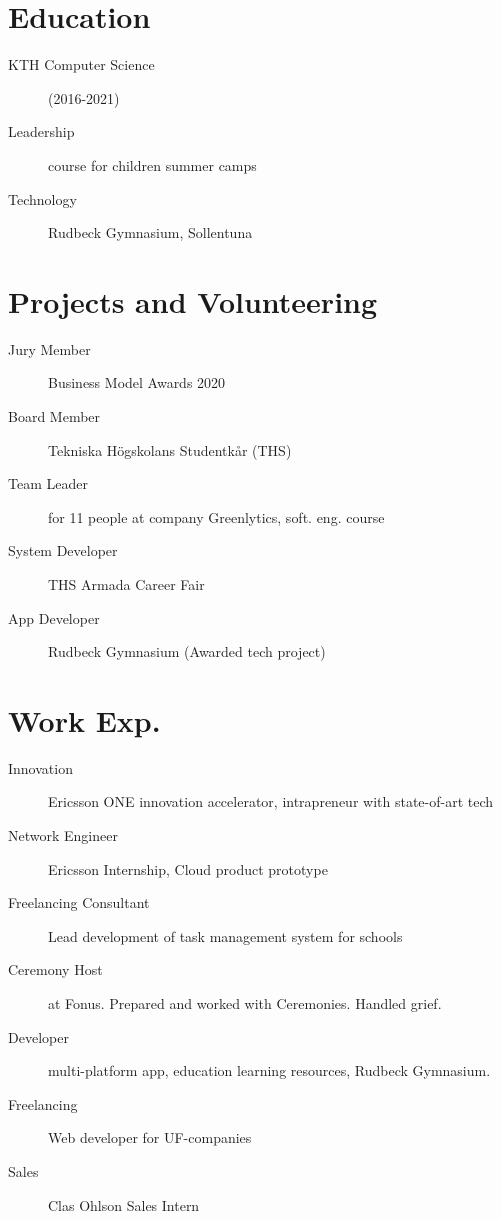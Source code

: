 \documentclass[margin,line,a4paper]{resume}
\begin{document}
\begin{resume}
\section{\mysidestyle Education}\vspace{1mm}
    \begin{description}
        \item[KTH Computer Science] (2016-2021)
         \item[Leadership] course for children summer camps
        \item[Technology] Rudbeck Gymnasium, Sollentuna
    \end{description} 

\section{\mysidestyle Projects and Volunteering}\vspace{1mm}
\begin{description}
    \item[Jury Member] Business Model Awards 2020 
    \item[Board Member] Tekniska Högskolans Studentkår (THS) 
    \item[Team Leader] for 11 people at company Greenlytics, soft. eng. course  
     \item[System Developer] THS Armada Career Fair
    \item[App Developer] Rudbeck Gymnasium (Awarded tech project) 

\end{description}  
  
\section{\mysidestyle Work Exp.}\vspace{1mm}
\begin{description}
    \item[Innovation] Ericsson ONE innovation accelerator, intrapreneur with state-of-art tech
    \item[Network Engineer] Ericsson Internship, Cloud product prototype
    \item[Freelancing Consultant] Lead development of task management system for schools
    \item[Ceremony Host] at Fonus. Prepared and worked with Ceremonies. Handled grief.
    \item[Developer] multi-platform app, education learning resources, Rudbeck Gymnasium.
    \item[Freelancing] Web developer for UF-companies
    \item[Sales] Clas Ohlson Sales Intern
\end{description}


\end{resume}
\end{document}
